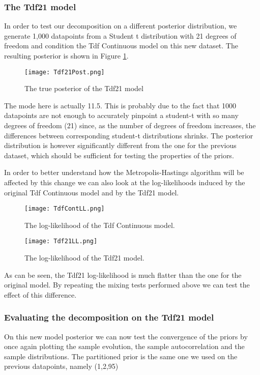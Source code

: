 \subsubsection{The Tdf21 model}
In order to test our decomposition on a different posterior distribution, we generate 1,000 datapoints from a Student t distribution with 21 degrees of freedom and condition the Tdf Continuous model on this new dataset. The resulting posterior is shown in Figure \ref{fig:21Post}.

\begin{figure}[H]
    \centering
    \texttt{[image: Tdf21Post.png]}
    \caption{The true posterior of the Tdf21 model}
    \label{fig:21Post}
\end{figure}

The mode here is actually 11.5. This is probably due to the fact that 1000 datapoints are not enough to accurately pinpoint a student-t with so many degrees of freedom (21) since, as the number of degrees of freedom increases, the differences between corresponding student-t distributions shrinks. 
The posterior distribution is however significantly different from the one for the previous dataset, which should be sufficient for testing the properties of the priors.

In order to better understand how the Metropolis-Hastings algorithm will be affected by this change we can also look at the log-likelihoods induced by the original Tdf Continuous model and by the Tdf21 model.

\begin{figure}[H]
    \centering
    \texttt{[image: TdfContLL.png]}
    \caption{The log-likelihood of the Tdf Continuous model.}
    \label{fig:TdfLL}
\end{figure}

\begin{figure}[H]
    \centering
    \texttt{[image: Tdf21LL.png]}
    \caption{The log-likelihood of the Tdf21 model.}
    \label{fig:Tdf21LL}
\end{figure}

As can be seen, the Tdf21 log-likelihood is much flatter than the one for the original model. By repeating the mixing tests performed above we can test the effect of this difference.

\subsubsection{Evaluating the decomposition on the Tdf21 model}
On this new model posterior we can now test the convergence of the priors by once again plotting the sample evolution, the sample autocorrelation and the sample distributions. The partitioned prior is the same one we used on the previous datapoints, namely (1,2,95)


